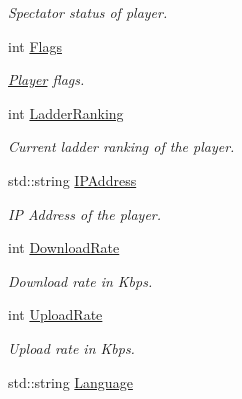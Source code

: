 \begin{DoxyCompactItemize}
\begin{DoxyCompactList}\small\item\em Spectator status of player. \end{DoxyCompactList}\item 
\hypertarget{structPlayer_aa151b994eedc8ba67b3fd48905db5ac0}{int \hyperlink{structPlayer_aa151b994eedc8ba67b3fd48905db5ac0}{Flags}}\label{structPlayer_aa151b994eedc8ba67b3fd48905db5ac0}

\begin{DoxyCompactList}\small\item\em \hyperlink{structPlayer}{Player} flags. \end{DoxyCompactList}\item 
\hypertarget{structPlayer_a25fe69852f0e38f541ad615cd59877ef}{int \hyperlink{structPlayer_a25fe69852f0e38f541ad615cd59877ef}{Ladder\-Ranking}}\label{structPlayer_a25fe69852f0e38f541ad615cd59877ef}

\begin{DoxyCompactList}\small\item\em Current ladder ranking of the player. \end{DoxyCompactList}\item 
\hypertarget{structPlayer_a388787a2218deeaf7318f0fbbd3f5d0f}{std\-::string \hyperlink{structPlayer_a388787a2218deeaf7318f0fbbd3f5d0f}{I\-P\-Address}}\label{structPlayer_a388787a2218deeaf7318f0fbbd3f5d0f}

\begin{DoxyCompactList}\small\item\em I\-P Address of the player. \end{DoxyCompactList}\item 
\hypertarget{structPlayer_a7fcee993ceed3c2b737782bc549e11bf}{int \hyperlink{structPlayer_a7fcee993ceed3c2b737782bc549e11bf}{Download\-Rate}}\label{structPlayer_a7fcee993ceed3c2b737782bc549e11bf}

\begin{DoxyCompactList}\small\item\em Download rate in Kbps. \end{DoxyCompactList}\item 
\hypertarget{structPlayer_a28f9a31a54ac8ea0658a6b234523b29d}{int \hyperlink{structPlayer_a28f9a31a54ac8ea0658a6b234523b29d}{Upload\-Rate}}\label{structPlayer_a28f9a31a54ac8ea0658a6b234523b29d}

\begin{DoxyCompactList}\small\item\em Upload rate in Kbps. \end{DoxyCompactList}\item 
\hypertarget{structPlayer_a583abe4cc5985fc83bfed62362efa358}{std\-::string \hyperlink{structPlayer_a583abe4cc5985fc83bfed62362efa358}{Language}}\label{structPlayer_a583abe4cc5985fc83bfed62362efa358}


\end{DoxyCompactItemize}
